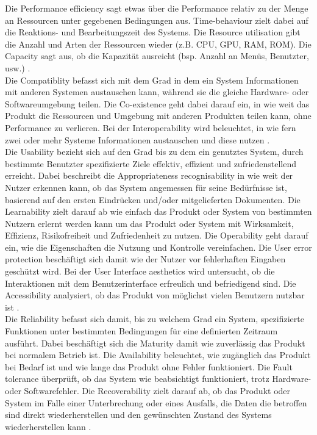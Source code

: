 Die Performance efficiency sagt etwas über die Performance relativ zu der Menge an Ressourcen unter gegebenen Bedingungen aus. Time-behaviour zielt dabei auf die Reaktions- und Bearbeitungszeit des Systems. Die Resource utilisation gibt die Anzahl und Arten der Ressourcen wieder (z.B. CPU, GPU, RAM, ROM). Die Capacity sagt aus, ob die Kapazität ausreicht (bsp. Anzahl an Menüs, Benutzter, usw.) \cite{iso25010}.\\

Die Compatiblity befasst sich mit dem Grad in dem ein System Informationen mit anderen Systemen austauschen kann, während sie die gleiche Hardware- oder Softwareumgebung teilen. Die Co-existence geht dabei darauf ein, in wie weit das Produkt die Ressourcen und Umgebung mit anderen Produkten teilen kann, ohne Performance zu verlieren. Bei der Interoperability wird beleuchtet, in wie fern zwei oder mehr Systeme Informationen austauschen und diese nutzen \cite{iso25010}.\\

Die Usability bezieht sich auf den Grad bis zu dem ein genutztes System, durch bestimmte Benutzter spezifizierte Ziele effektiv, effizient und zufriedenstellend erreicht. Dabei beschreibt die Appropriateness recognisability in wie weit der Nutzer erkennen kann, ob das System angemessen für seine Bedürfnisse ist, basierend auf den ersten Eindrücken und/oder mitgelieferten Dokumenten. Die Learnability zielt darauf ab wie einfach das Produkt oder System von bestimmten Nutzern erlernt werden kann um das Produkt oder System mit Wirksamkeit, Effizienz, Risikofreiheit und Zufriedenheit zu nutzen. Die Operability geht darauf ein, wie die Eigenschaften die Nutzung und Kontrolle vereinfachen. Die User error protection beschäftigt sich damit wie der Nutzer vor fehlerhaften Eingaben geschützt wird. Bei der User Interface aesthetics wird untersucht, ob die Interaktionen mit dem Benutzerinterface erfreulich und befriedigend sind. Die Accessibility analysiert, ob das Produkt von möglichst vielen Benutzern nutzbar ist \cite{iso25010}. \\


Die Reliability befasst sich damit, bis zu welchem Grad ein System, spezifizierte Funktionen unter bestimmten Bedingungen für eine definierten Zeitraum ausführt. Dabei beschäftigt sich die Maturity damit wie zuverlässig das Produkt bei normalem Betrieb ist. Die Availability beleuchtet, wie zugänglich das Produkt bei Bedarf ist und wie lange das Produkt ohne Fehler funktioniert. Die Fault tolerance überprüft, ob das System wie beabsichtigt funktioniert, trotz Hardware- oder Softwarefehler. Die Recoverability zielt darauf ab, ob das Produkt oder System im Falle einer Unterbrechung oder eines Ausfalls, die Daten die betroffen sind direkt wiederherstellen und den gewünschten Zustand des Systems wiederherstellen kann \cite{iso25010}.\\


